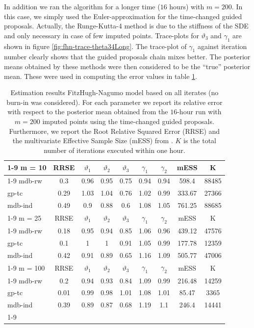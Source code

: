 \documentclass[preprint]{imsart}
\newcommand{\ga}{\gamma}
\theoremstyle{definition}
\begin{document}
In addition we ran the algorithm for a longer time ($16$ hours) with $m=200$. In this case, we simply used the Euler-approximation for the time-changed guided proposals. Actually, the  Runge-Kutta-4 method is due to the stiffness of the SDE and only necessary in case of few imputed points.    Trace-plots for $\vartheta_3$ and $\ga_1$ are shown in figure \ref{fig:fhn-trace-theta34Long}. The trace-plot of $\ga_1$ against iteration number clearly shows that the guided proposals chain mixes better.  The posterior means obtained by these methods were then considered to be the ``true'' posterior mean. These were used in computing the error values in table \ref{table:fh}. 


\begin{table}
{\small
\begin{tabular}{l || c | c | c | c | c | c| c | c}\toprule
\cmidrule{1-9}
 m =  10  & RRSE &$ \vartheta_1 $ &  $ \vartheta_2 $ &  $ \vartheta_3 $ &  $ \gamma_1 $ &  $ \gamma_2 $ &  mESS & K\\
\cmidrule{1-9}
mdb-rw  &  0.3  & 0.96  & 0.95  & 0.75  & 0.94  & 0.94  &   598.4  &88485 \\ 
gp-tc  &  0.29  & 1.03  & 1.04  & 0.76  & 1.02  & 0.99  &   333.67  &27366 \\ 
mdb-ind  &  0.49  & 0.9  & 0.88  & 0.6  & 1.08  & 1.05  &   761.25  &88685 \\ 
\cmidrule{1-9}
 m =  25  & RRSE &$ \vartheta_1 $ &  $ \vartheta_2 $ &  $ \vartheta_3 $ &  $ \gamma_1 $ &  $ \gamma_2 $ &  mESS & K\\
\cmidrule{1-9}
mdb-rw  &  0.18  & 0.95  & 0.94  & 0.85  & 1.06  & 0.96  &   439.12  &47576 \\ 
gp-tc  &  0.1  & 1  & 1  & 0.91  & 1.05  & 0.99  &   177.78  &12359 \\ 
mdb-ind  &  0.42  & 0.91  & 0.89  & 0.65  & 1.16  & 1.09  &   505.77  &47006 \\ 
\cmidrule{1-9}
 m =  100  & RRSE &$ \vartheta_1 $ &  $ \vartheta_2 $ &  $ \vartheta_3 $ &  $ \gamma_1 $ &  $ \gamma_2 $ &  mESS & K\\
\cmidrule{1-9}
mdb-rw  &  0.2  & 0.94  & 0.93  & 0.84  & 1.09  & 0.99  &   216.48  &14259 \\ 
gp-tc  &  0.01  & 0.99  & 0.98  & 1.01  & 1.08  & 1.01  &   85.47  &3365 \\ 
mdb-ind  &  0.39  & 0.89  & 0.87  & 0.68  & 1.19  & 1.1  &   246.4  &14441 \\ 
\cmidrule{1-9}
\end{tabular}
}
\caption{Estimation results FitzHugh-Nagumo model based on all iterates (no burn-in was considered). For each parameter we report its relative error with respect to the posterior mean obtained from the $16$-hour run with $m=200$ imputed points using the time-changed guided proposals.  Furthermore, we report the Root Relative Squared Error (RRSE) and the multivariate Effective Sample Size (mESS) from \cite{vats}. $K$ is the total number of iterations executed within one hour.  }
\label{table:fh}
\end{table}
\end{document}
